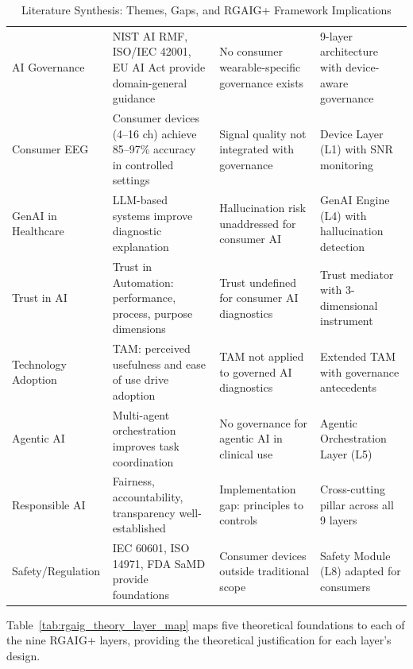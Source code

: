 \begingroup\singlespacing\tablefontsize\tablestripes
\begin{xltabular}{\textwidth}{@{} l X X X @{}}
\caption{Literature Synthesis: Themes, Gaps, and RGAIG+ Framework Implications}
\label{tab:rgaig_lit_synthesis}\\
\toprule
{} &  &  &  \\
\midrule
\endfirsthead
\endhead
\bottomrule
\endlastfoot
AI Governance & NIST AI RMF, ISO/IEC 42001, EU AI Act provide domain-general guidance & No consumer wearable-specific governance exists & 9-layer architecture with device-aware governance \\
\addlinespace
Consumer EEG & Consumer devices (4--16 ch) achieve 85--97\% accuracy in controlled settings & Signal quality not integrated with governance & Device Layer (L1) with SNR monitoring \\
\addlinespace
GenAI in Healthcare & LLM-based systems improve diagnostic explanation & Hallucination risk unaddressed for consumer AI & GenAI Engine (L4) with hallucination detection \\
\addlinespace
Trust in AI & Trust in Automation: performance, process, purpose dimensions & Trust undefined for consumer AI diagnostics & Trust mediator with 3-dimensional instrument \\
\addlinespace
Technology Adoption & TAM: perceived usefulness and ease of use drive adoption & TAM not applied to governed AI diagnostics & Extended TAM with governance antecedents \\
\addlinespace
Agentic AI & Multi-agent orchestration improves task coordination & No governance for agentic AI in clinical use & Agentic Orchestration Layer (L5) \\
\addlinespace
Responsible AI & Fairness, accountability, transparency well-established & Implementation gap: principles to controls & Cross-cutting pillar across all 9 layers \\
\addlinespace
Safety/Regulation & IEC 60601, ISO 14971, FDA SaMD provide foundations & Consumer devices outside traditional scope & Safety Module (L8) adapted for consumers \\
\end{xltabular}
\endgroup

Table~\ref{tab:rgaig_theory_layer_map} maps five theoretical foundations to each of the nine RGAIG+ layers, providing the theoretical justification for each layer's design.


